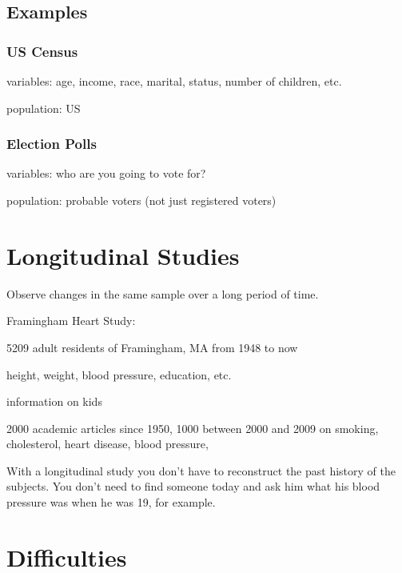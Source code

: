 \documentclass[landscape]{exam}
\begin{document}
  \subsection{Examples}

  \subsubsection{US Census}
  \begin{itemize*}
   \item variables: age, income, race, marital, status, number of children, etc.
   \item population: US
  \end{itemize*}

  \subsubsection{Election Polls}
  \begin{itemize*}
   \item variables: who are you going to vote for?
   \item population: probable voters (not just registered voters)
  \end{itemize*}

  \section{Longitudinal Studies} 
  Observe changes in the same sample over a long period of time.

  Framingham Heart Study:
  \begin{itemize*}
    \item 5209 adult residents of Framingham, MA from 1948 to now
    \item height, weight, blood pressure, education, etc.
    \item information on kids 
    \item 2000 academic articles since 1950, 1000 between 2000 and 2009 on
      smoking, cholesterol, heart disease, blood pressure, 
  \end{itemize*}

  With a longitudinal study you don't have to reconstruct the past history of
  the subjects. You don't need to find someone today and ask him what his blood
  pressure was when he was 19, for example.

  \section{Difficulties}
\end{document}
